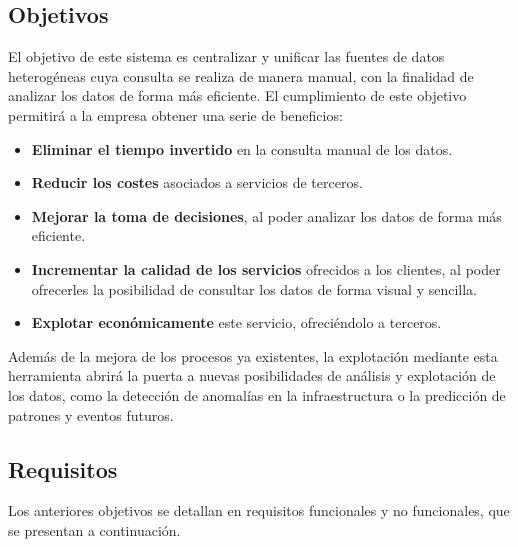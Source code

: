 \subsection{Objetivos}\label{subsec:objetivos}
El objetivo de este sistema es centralizar y unificar las fuentes de datos heterogéneas
cuya consulta se realiza de manera manual, con la finalidad de analizar los datos de forma
más eficiente. El cumplimiento de este objetivo permitirá a la empresa obtener una serie de
beneficios:

\begin{itemize}
	\item \textbf{Eliminar el tiempo invertido} en la consulta manual de los datos.
	\item \textbf{Reducir los costes} asociados a servicios de terceros.
	\item \textbf{Mejorar la toma de decisiones}, al poder analizar los datos de forma más eficiente.
	\item \textbf{Incrementar la calidad de los servicios} ofrecidos a los clientes, al poder ofrecerles
	      la posibilidad de consultar los datos de forma visual y sencilla.
	\item \textbf{Explotar económicamente} este servicio, ofreciéndolo a terceros.
\end{itemize}

Además de la mejora de los procesos ya existentes, la explotación mediante esta herramienta
abrirá la puerta a nuevas posibilidades de análisis y explotación de los datos, como la detección
de anomalías en la infraestructura o la predicción de patrones y eventos futuros.

\subsection{Requisitos}\label{subsec:requisitos}
Los anteriores objetivos se detallan en requisitos funcionales y no funcionales, que se
presentan a continuación.

